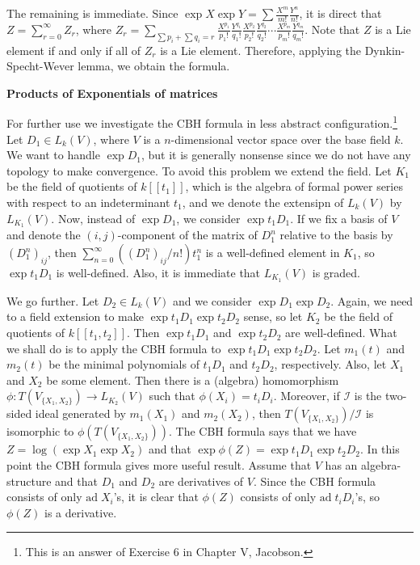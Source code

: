 \documentclass{article}
\newcommand{\ad}[1]{\mathrm{ad}\; #1}
\begin{document}
The remaining is immediate.
Since $\exp{X} \exp{Y} = \sum \frac{X^m}{m!} \frac{Y^n}{n!}$, it is direct that $Z = \sum_{r = 0}^\infty Z_r$, where $Z_r = \sum_{\sum p_i + \sum q_i = r} \frac{X^{p_1}}{p_1!} \frac{Y^{q_1}}{q_1!} \frac{X^{p_2}}{p_2!} \frac{Y^{q_2}}{q_2!} \cdots \frac{X^{p_m}}{p_m!} \frac{Y^{q_m}}{q_m!}$.
Note that $Z$ is a Lie element if and only if all of $Z_r$ is a Lie element.
Therefore, applying the Dynkin-Specht-Wever lemma, we obtain the formula.

\newpage

\textbf{Products of Exponentials of matrices}

For further use we investigate the CBH formula in less abstract configuration.\footnote{This is an answer of Exercise 6 in Chapter V, Jacobson.}
Let $D_1 \in L_k(V)$, where $V$ is a $n$-dimensional vector space over the base field $k$.
We want to handle $\exp{D_1}$, but it is generally nonsense since we do not have any topology to make convergence.
To avoid this problem we extend the field.
Let $K_1$ be the field of quotients of $k[[t_1]]$, which is the algebra of formal power series with respect to an indeterminant $t_1$, and we denote the extensipn of $L_k(V)$ by $L_{K_1}(V)$.
Now, instead of $\exp{D_1}$, we consider $\exp{t_1 D_1}$.
If we fix a basis of $V$ and denote the $(i, j)$-component of the matrix of $D_1^n$ relative to the basis by $(D_1^n)_{ij}$, then $\sum_{n = 0}^\infty ((D_1^n)_{ij}/n!) t_1^n$ is a well-defined element in $K_1$, so $\exp{t_1 D_1}$ is well-defined.
Also, it is immediate that $L_{K_1}(V)$ is graded.

We go further.
Let $D_2 \in L_k(V)$ and we consider $\exp{D_1} \exp{D_2}$.
Again, we need to a field extension to make $\exp{t_1 D_1} \exp{t_2 D_2}$ sense, so let $K_2$ be the field of quotients of $k[[t_1, t_2]]$.
Then $\exp{t_1 D_1}$ and $\exp{t_2 D_2}$ are well-defined.
What we shall do is to apply the CBH formula to $\exp{t_1 D_1} \exp{t_2 D_2}$.
Let $m_1(t)$ and $m_2(t)$ be the minimal polynomials of $t_1 D_1$ and $t_2 D_2$, respectively.
Also, let $X_1$ and $X_2$ be some element.
Then there is a (algebra) homomorphism $\phi : T(V_{\{X_1, X_2\}}) \to L_{K_2}(V)$ such that $\phi(X_i) = t_i D_i$.
Moreover, if $\mathcal{I}$ is the two-sided ideal generated by $m_1(X_1)$ and $m_2(X_2)$, then $T(V_{\{X_1, X_2\}})/\mathcal{I}$ is isomorphic to $\phi(T(V_{\{X_1, X_2\}}))$.
The CBH formula says that we have $Z = \log{(\exp{X_1} \exp{X_2})}$ and that $\exp{\phi(Z)} = \exp{t_1 D_1} \exp{t_2 D_2}$.
In this point the CBH formula gives more useful result.
Assume that $V$ has an algebra-structure and that $D_1$ and $D_2$ are derivatives of $V$.
Since the CBH formula consists of only $\ad{X_i}$'s, it is clear that $\phi(Z)$ consists of only $\ad{t_i D_i}$'s, so $\phi(Z)$ is a derivative.
\end{document}

